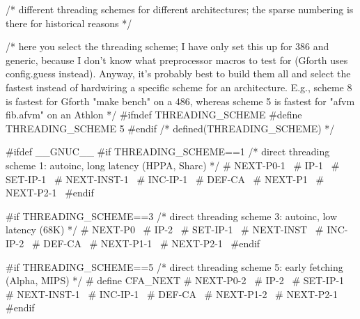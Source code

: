 \documentclass[10pt,english]{article}
\begin{document}
\nwenddocs{}\endmoddef
/* different threading schemes for different architectures; the sparse
   numbering is there for historical reasons */

/* here you select the threading scheme; I have only set this up for
   386 and generic, because I don't know what preprocessor macros to
   test for (Gforth uses config.guess instead).  Anyway, it's probably
   best to build them all and select the fastest instead of hardwiring
   a specific scheme for an architecture.  E.g., scheme 8 is fastest
   for Gforth "make bench" on a 486, whereas scheme 5 is fastest for
   "afvm fib.afvm" on an Athlon */
#ifndef THREADING_SCHEME
#define THREADING_SCHEME 5
#endif /* defined(THREADING_SCHEME) */

#ifdef __GNUC__
#if THREADING_SCHEME==1
/* direct threading scheme 1: autoinc, long latency (HPPA, Sharc) */
#  \LA{}NEXT-P0-1~{\nwtagstyle{}}\RA{}
#  \LA{}IP-1~{\nwtagstyle{}}\RA{}
#  \LA{}SET-IP-1~{\nwtagstyle{}}\RA{}
#  \LA{}NEXT-INST-1~{\nwtagstyle{}}\RA{}
#  \LA{}INC-IP-1~{\nwtagstyle{}}\RA{}
#  \LA{}DEF-CA~{\nwtagstyle{}}\RA{}
#  \LA{}NEXT-P1~{\nwtagstyle{}}\RA{}
#  \LA{}NEXT-P2-1~{\nwtagstyle{}}\RA{}
#endif

#if THREADING_SCHEME==3
/* direct threading scheme 3: autoinc, low latency (68K) */
#  \LA{}NEXT-P0~{\nwtagstyle{}}\RA{}
#  \LA{}IP-2~{\nwtagstyle{}}\RA{}
#  \LA{}SET-IP-1~{\nwtagstyle{}}\RA{}
#  \LA{}NEXT-INST~{\nwtagstyle{}}\RA{}
#  \LA{}INC-IP-2~{\nwtagstyle{}}\RA{}
#  \LA{}DEF-CA~{\nwtagstyle{}}\RA{}
#  \LA{}NEXT-P1-1~{\nwtagstyle{}}\RA{}
#  \LA{}NEXT-P2-1~{\nwtagstyle{}}\RA{}
#endif

#if THREADING_SCHEME==5
/* direct threading scheme 5: early fetching (Alpha, MIPS) */
#  define CFA_NEXT
#  \LA{}NEXT-P0-2~{\nwtagstyle{}}\RA{}
#  \LA{}IP-2~{\nwtagstyle{}}\RA{}
#  \LA{}SET-IP-1~{\nwtagstyle{}}\RA{}
#  \LA{}NEXT-INST-1~{\nwtagstyle{}}\RA{}
#  \LA{}INC-IP-1~{\nwtagstyle{}}\RA{}
#  \LA{}DEF-CA~{\nwtagstyle{}}\RA{}
#  \LA{}NEXT-P1-2~{\nwtagstyle{}}\RA{}
#  \LA{}NEXT-P2-1~{\nwtagstyle{}}\RA{}
#endif
\end{document}
